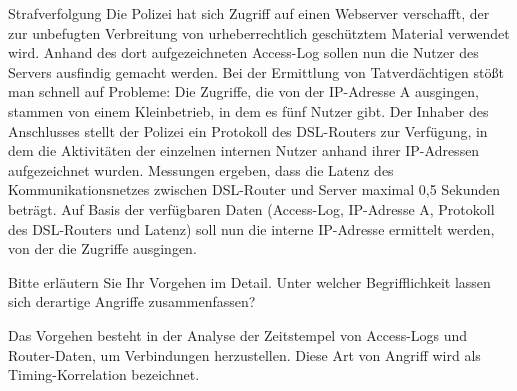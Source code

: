 \documentclass{article}
\begin{document}
\begin{exercise}{Strafverfolgung}
  Die Polizei hat sich Zugriff auf einen Webserver verschafft, der zur unbefugten Verbreitung von urheberrechtlich geschütztem Material verwendet wird. Anhand des dort aufgezeichneten Access-Log sollen nun die Nutzer des Servers ausfindig gemacht werden. Bei der Ermittlung von Tatverdächtigen stößt man schnell auf Probleme: Die Zugriffe, die von der IP-Adresse A ausgingen, stammen von einem Kleinbetrieb, in dem es fünf Nutzer gibt. Der Inhaber des Anschlusses stellt der Polizei ein Protokoll des DSL-Routers zur Verfügung, in dem die Aktivitäten der einzelnen internen Nutzer anhand ihrer IP-Adressen aufgezeichnet wurden. Messungen ergeben, dass die Latenz des Kommunikationsnetzes zwischen DSL-Router und Server maximal 0,5 Sekunden beträgt. Auf Basis der verfügbaren Daten (Access-Log, IP-Adresse A, Protokoll des DSL-Routers und Latenz) soll nun die interne IP-Adresse ermittelt werden, von der die Zugriffe ausgingen.

  Bitte erläutern Sie Ihr Vorgehen im Detail. Unter welcher Begrifflichkeit lassen sich derartige Angriffe zusammenfassen?

  \begin{solution}
    Das Vorgehen besteht in der Analyse der Zeitstempel von Access-Logs und Router-Daten, um Verbindungen herzustellen. Diese Art von Angriff wird als Timing-Korrelation bezeichnet.
  \end{solution}
\end{exercise}
\end{document}
